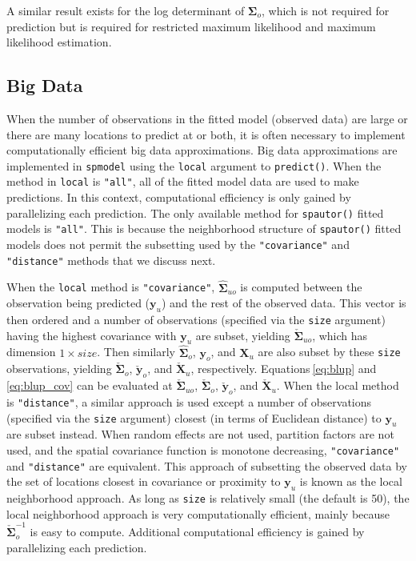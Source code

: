 \documentclass{article}
\begin{document}
A similar result exists for the log determinant of
\(\boldsymbol{\Sigma}_o\), which is not required for prediction but is
required for restricted maximum likelihood and maximum likelihood
estimation.

\hypertarget{big-data-1}{%
\subsection{Big Data}\label{big-data-1}}

When the number of observations in the fitted model (observed data) are
large or there are many locations to predict at or both, it is often
necessary to implement computationally efficient big data
approximations. Big data approximations are implemented in
\texttt{spmodel} using the \texttt{local} argument to
\texttt{predict()}. When the method in \texttt{local} is \texttt{"all"},
all of the fitted model data are used to make predictions. In this
context, computational efficiency is only gained by parallelizing each
prediction. The only available method for \texttt{spautor()} fitted
models is \texttt{"all"}. This is because the neighborhood structure of
\texttt{spautor()} fitted models does not permit the subsetting used by
the \texttt{"covariance"} and \texttt{"distance"} methods that we
discuss next.

When the \texttt{local} method is \texttt{"covariance"},
\(\hat{\boldsymbol{\Sigma}}_{uo}\) is computed between the observation
being predicted (\(\mathbf{y}_u\)) and the rest of the observed data.
This vector is then ordered and a number of observations (specified via
the \texttt{size} argument) having the highest covariance with
\(\mathbf{y}_u\) are subset, yielding
\(\check{\boldsymbol{\Sigma}}_{uo}\), which has dimension
\(1 \times size\). Then similarly \(\hat{\boldsymbol{\Sigma}}_o\),
\(\mathbf{y}_o\), and \(\mathbf{X}_u\) are also subset by these
\texttt{size} observations, yielding
\(\check{\boldsymbol{\Sigma}}_{o}\), \(\check{\mathbf{y}}_o\), and
\(\check{\mathbf{X}}_u\), respectively. Equations\(~\)\ref{eq:blup} and
\ref{eq:blup_cov} can be evaluated at
\(\check{\boldsymbol{\Sigma}}_{uo}\),
\(\check{\boldsymbol{\Sigma}}_{o}\), \(\check{\mathbf{y}}_o\), and
\(\check{\mathbf{X}}_u\). When the local method is \texttt{"distance"},
a similar approach is used except a number of observations (specified
via the \texttt{size} argument) closest (in terms of Euclidean distance)
to \(\mathbf{y}_u\) are subset instead. When random effects are not
used, partition factors are not used, and the spatial covariance
function is monotone decreasing, \texttt{"covariance"} and
\texttt{"distance"} are equivalent. This approach of subsetting the
observed data by the set of locations closest in covariance or proximity
to \(\mathbf{y}_u\) is known as the local neighborhood approach. As long
as \texttt{size} is relatively small (the default is 50), the local
neighborhood approach is very computationally efficient, mainly because
\(\check{\boldsymbol{\Sigma}}_{o}^{-1}\) is easy to compute. Additional
computational efficiency is gained by parallelizing each prediction.
\end{document}
